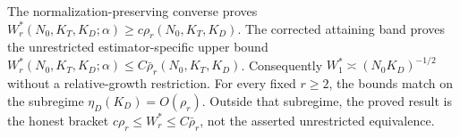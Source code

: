 The normalization-preserving converse proves \(W_r^*(N_0,K_T,K_D;\alpha)\ge c\rho_r(N_0,K_T,K_D)\). The corrected attaining band proves the unrestricted estimator-specific upper bound \(W_r^*(N_0,K_T,K_D;\alpha)\le C\bar\rho_r(N_0,K_T,K_D)\). Consequently \(W_1^*\asymp(N_0K_D)^{-1/2}\) without a relative-growth restriction. For every fixed \(r\ge2\), the bounds match on the subregime \(\eta_D(K_D)=O(\rho_r)\). Outside that subregime, the proved result is the honest bracket \(c\rho_r\le W_r^*\le C\bar\rho_r\), not the asserted unrestricted equivalence.